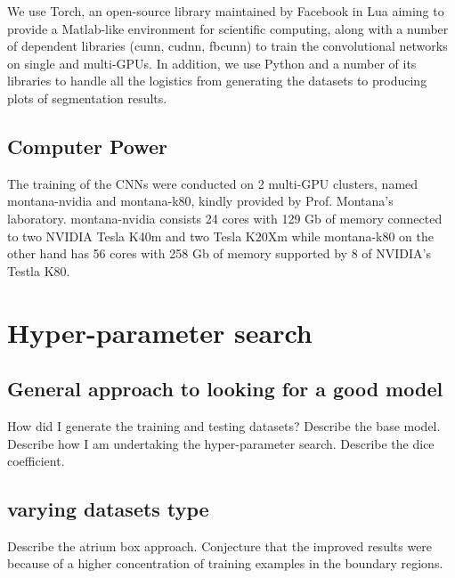 We use Torch, an open-source library maintained by Facebook in Lua aiming to provide a Matlab-like environment for scientific computing, along with a number of dependent libraries (cunn, cudnn, fbcunn) to train the convolutional networks on single and multi-GPUs. In addition, we use Python and a number of its libraries to handle all the logistics from generating the datasets to producing plots of segmentation results.

\subsection{Computer Power}

The training of the CNNs were conducted on 2 multi-GPU clusters, named montana-nvidia and montana-k80, kindly provided by Prof. Montana's laboratory. montana-nvidia consists 24 cores with 129 Gb of memory connected to two NVIDIA Tesla K40m and two Tesla K20Xm while montana-k80 on the other hand has 56 cores with 258 Gb of memory supported by 8 of NVIDIA's Testla K80. 

\section{Hyper-parameter search}

\subsection{General approach to looking for a good model}

How did I generate the training and testing datasets?
Describe the base model. Describe how I am undertaking the hyper-parameter search. Describe the dice coefficient.

\subsection{varying datasets type}

Describe the atrium box approach. Conjecture that the improved results were because of a higher concentration of training examples in the boundary regions.

